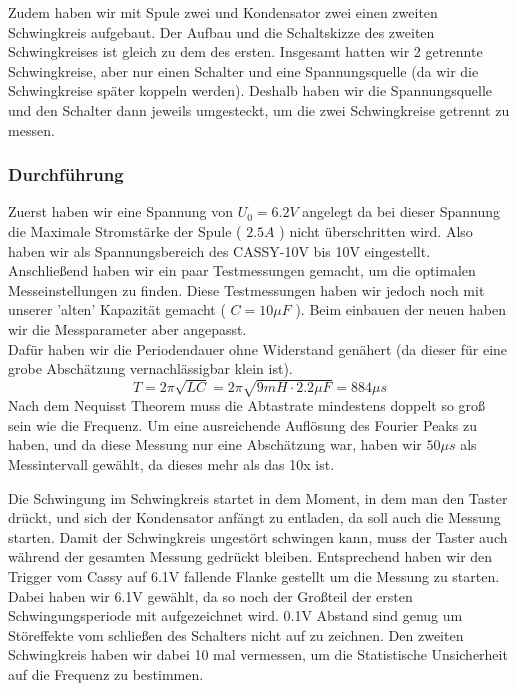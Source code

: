 \documentclass[twoside]{protokoll}
\begin{document}
Zudem haben wir mit Spule zwei und Kondensator zwei einen zweiten Schwingkreis aufgebaut.
Der Aufbau und die Schaltskizze des zweiten Schwingkreises ist gleich zu dem des ersten.
Insgesamt hatten wir 2 getrennte Schwingkreise, aber nur einen Schalter und eine Spannungsquelle (da wir die Schwingkreise später koppeln werden).
Deshalb haben wir die Spannungsquelle und den Schalter dann jeweils umgesteckt, um die zwei Schwingkreise getrennt zu messen.




\subsubsection{Durchführung}
Zuerst haben wir eine Spannung von $U_0 = 6.2V$ angelegt da bei dieser Spannung die Maximale Stromstärke der Spule ( $2.5A$ ) nicht überschritten wird.
Also haben wir als Spannungsbereich des CASSY-10V bis 10V eingestellt.
Anschließend haben wir ein paar Testmessungen gemacht, um die optimalen Messeinstellungen zu finden.
Diese Testmessungen haben wir jedoch noch mit unserer 'alten' Kapazität gemacht ( $C = 10 \mu F$ ).
Beim einbauen der neuen haben wir die Messparameter aber angepasst.\\
Dafür haben wir die Periodendauer ohne Widerstand genähert (da dieser für eine grobe Abschätzung vernachlässigbar klein ist).
\begin{equation}
    T = 2 \pi \sqrt{LC} = 2 \pi \sqrt{9mH \cdot 2.2 \mu F} = 884 \mu s
\end{equation}
Nach dem Nequisst Theorem muss die Abtastrate mindestens doppelt so groß sein wie die Frequenz.
Um eine ausreichende Auflösung des Fourier Peaks zu haben, und da diese Messung nur eine Abschätzung war, haben wir $ 50 \mu s $ als Messintervall gewählt, da dieses mehr als das 10x ist.

 
Die Schwingung im Schwingkreis startet in dem Moment, in dem man den Taster drückt, und sich der Kondensator anfängt zu entladen, da soll auch die Messung starten.
Damit der Schwingkreis ungestört schwingen kann, muss der Taster auch während der gesamten Messung gedrückt bleiben.
Entsprechend haben wir den Trigger vom Cassy auf 6.1V fallende Flanke gestellt um die Messung zu starten.
Dabei haben wir 6.1V gewählt, da so noch der Großteil der ersten Schwingungsperiode mit aufgezeichnet wird.
0.1V Abstand sind genug um Störeffekte vom schließen des Schalters nicht auf zu zeichnen.
Den zweiten Schwingkreis haben wir dabei 10 mal vermessen, um die Statistische Unsicherheit auf die Frequenz zu bestimmen.
\end{document}
